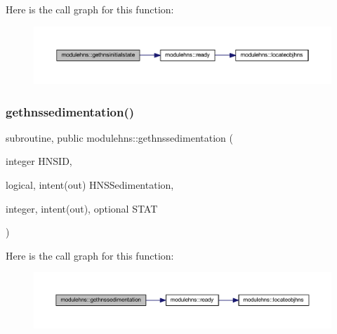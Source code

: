 Here is the call graph for this function\+:\nopagebreak
\begin{figure}[H]
\begin{center}
\leavevmode
\includegraphics[width=350pt]{namespacemodulehns_ade4bb11bbb379ee7bb16ff28af1174e6_cgraph}
\end{center}
\end{figure}
\mbox{\label{namespacemodulehns_a7dda9b6f209c0922b44bc935eadbf01a}} 
\subsubsection{\texorpdfstring{gethnssedimentation()}{gethnssedimentation()}}
{\footnotesize\ttfamily subroutine, public modulehns\+::gethnssedimentation (\begin{DoxyParamCaption}\item[{integer}]{H\+N\+S\+ID,  }\item[{logical, intent(out)}]{H\+N\+S\+Sedimentation,  }\item[{integer, intent(out), optional}]{S\+T\+AT }\end{DoxyParamCaption})}

Here is the call graph for this function\+:\nopagebreak
\begin{figure}[H]
\begin{center}
\leavevmode
\includegraphics[width=350pt]{namespacemodulehns_a7dda9b6f209c0922b44bc935eadbf01a_cgraph}
\end{center}
\end{figure}
\mbox{\label{namespacemodulehns_a348f38143e5b2cd8130f996bf16a44a2}} 
